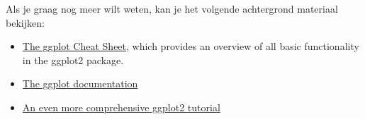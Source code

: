\documentclass[]{tufte-book}
\providecommand{\tightlist}{%
  \setlength{\itemsep}{0pt}\setlength{\parskip}{0pt}}
\begin{document}
Als je graag nog meer wilt weten, kan je het volgende achtergrond materiaal bekijken:

\begin{itemize}
\tightlist
\item
  \href{https://www.rstudio.com/wp-content/uploads/2015/03/ggplot2-cheatsheet.pdf}{The ggplot Cheat Sheet}, which provides an overview of all basic functionality in the ggplot2 package.
\item
  \href{http://docs.ggplot2.org/current/}{The ggplot documentation}
\item
  \href{http://tutorials.iq.harvard.edu/R/Rgraphics/Rgraphics.html}{An even more comprehensive ggplot2 tutorial}
\end{itemize}


\end{document}

